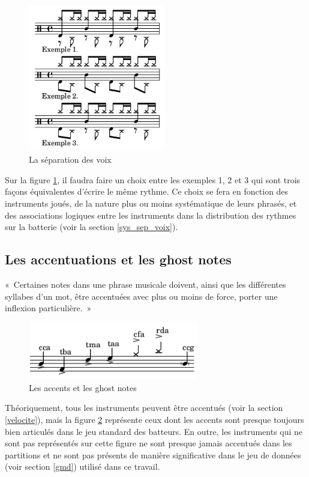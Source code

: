 \begin{figure}[h]
	\centering
	\includegraphics[height=65mm, width=60mm]{
    z_images/3_methodes/0_notation_de_la_batterie/7_voix.png}
	\caption{La séparation des voix}
	\label{sep_voix}
\end{figure}
Sur la figure \ref{sep_voix}, il faudra faire un choix entre les exemples 1, 2
et 3 qui sont trois façons équivalentes d’écrire le même rythme.
Ce choix se fera en fonction des instruments joués, de la nature plus ou moins
systématique de leurs phrasés, et des associations logiques entre les
instruments dans la distribution des rythmes sur la batterie (voir la section
\ref{sys_sep_voix}).

\subsection*{Les accentuations et les ghost notes}
«~Certaines notes dans une phrase musicale doivent, ainsi que les différentes
syllabes d’un mot, être accentuées avec plus ou moins de force, porter une
inflexion particulière.~» \cite{danhauser}
\begin{figure}[h]
\centering
\includegraphics[height=25mm, width=75mm]{
z_images/3_methodes/0_notation_de_la_batterie/8_accents_et_ghost-notes_0.png}
\caption{Les accents et les ghost notes}
\label{accents_et_gn}
\end{figure}

Théoriquement, tous les instruments peuvent être accentués (voir la section
\ref{velocite}), mais la figure \ref{accents_et_gn} représente ceux dont les
accents sont presque toujours bien articulés dans le jeu standard des batteurs.
En outre, les instruments qui ne sont pas représentés sur cette
figure ne sont presque jamais accentués dans les partitions et ne sont pas
présents de manière significative dans le jeu de données (voir section \ref{gmd}) utilisé dans ce
travail.


